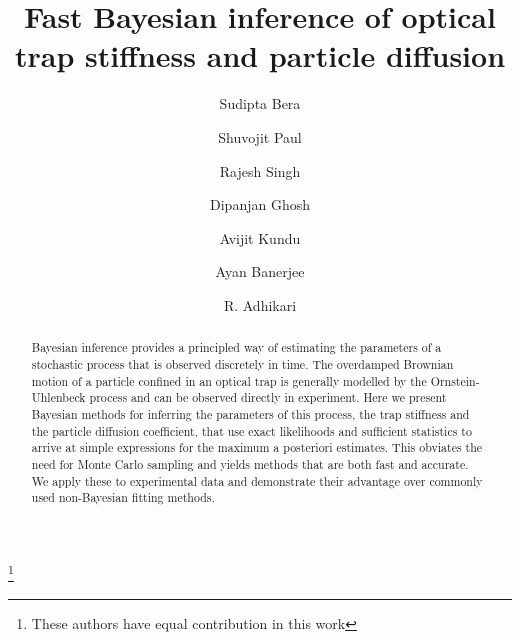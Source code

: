 \documentclass[english,aps, onecolumn, prl,superscriptaddress, notitlepage]{revtex4-1}
\begin{document}
\title{Fast Bayesian inference of optical trap stiffness and particle diffusion}

\author{Sudipta Bera\dag{}}


\author{Shuvojit Paul\dag{}}


\author{Rajesh Singh}


\author{Dipanjan Ghosh}


\author{Avijit Kundu}


\author{Ayan Banerjee}



\author{R. Adhikari}



\thanks{\dag These authors have equal contribution in this work}
\begin{abstract}
Bayesian inference provides a principled way of estimating the parameters
of a stochastic process that is observed discretely in time. The overdamped
Brownian motion of a particle confined in an optical trap is generally
modelled by the Ornstein-Uhlenbeck process and can be observed directly
in experiment. Here we present Bayesian methods for inferring the
parameters of this process, the trap stiffness and the particle diffusion
coefficient, that use exact likelihoods and sufficient statistics
to arrive at simple expressions for the maximum a posteriori estimates.
This obviates the need for Monte Carlo sampling and yields methods
that are both fast and accurate. We apply these to experimental data
and demonstrate their advantage over commonly used non-Bayesian fitting
methods. 
\end{abstract}
\maketitle
\end{document}
